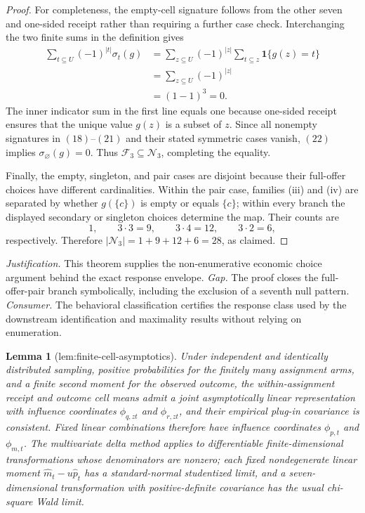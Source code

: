 \documentclass{article}
\newtheorem{lemma}{Lemma}
\begin{document}
\begin{proof}
For completeness, the empty-cell signature follows from the other
seven and one-sided receipt rather than requiring a further case
check.  Interchanging the two finite sums in the definition gives
\[
\begin{aligned}
\sum_{t\subseteq U}(-1)^{|t|}\sigma_t(g)
&=\sum_{z\subseteq U}(-1)^{|z|}
  \sum_{t\subseteq z}\mathbf 1\{g(z)=t\}\\
&=\sum_{z\subseteq U}(-1)^{|z|}\\
&=(1-1)^3=0.
\end{aligned} \tag{22}
\]
The inner indicator sum in the first line equals one because
one-sided receipt ensures that the unique value \(g(z)\) is a subset
of \(z\).  Since all nonempty signatures in
\((18)\)--\((21)\) and their stated symmetric cases vanish,
\((22)\) implies \(\sigma_\varnothing(g)=0\).  Thus
\(\mathcal F_3\subseteq\mathcal N_3\), completing the equality.

Finally, the empty, singleton, and pair cases are disjoint because
their full-offer choices have different cardinalities.  Within the
pair case, families (iii) and (iv) are separated by whether
\(g(\{c\})\) is empty or equals \(\{c\}\); within every branch the
displayed secondary or singleton choices determine the map.  Their counts are
\[
1,
\qquad
3\cdot3=9,
\qquad
3\cdot4=12,
\qquad
3\cdot2=6,
\]
respectively.  Therefore
\(|\mathcal N_3|=1+9+12+6=28\), as claimed.
\end{proof}
\par\smallskip\noindent \textit{Justification.} This theorem supplies the non-enumerative economic choice argument behind the exact response envelope. \textit{Gap.} The proof closes the full-offer-pair branch symbolically, including the exclusion of a seventh null pattern. \textit{Consumer.} The behavioral classification certifies the response class used by the downstream identification and maximality results without relying on enumeration.

\begin{lemma}[lem:finite-cell-asymptotics]\label{lem:finite-cell-asymptotics}
Under independent and identically distributed sampling, positive probabilities for the finitely many assignment arms, and a finite second moment for the observed outcome, the within-assignment receipt and outcome cell means admit a joint asymptotically linear representation with influence coordinates \(\phi_{q,zt}\) and \(\phi_{r,zt}\), and their empirical plug-in covariance is consistent.  Fixed linear combinations therefore have influence coordinates \(\phi_{p,t}\) and \(\phi_{m,t}\).  The multivariate delta method applies to differentiable finite-dimensional transformations whose denominators are nonzero; each fixed nondegenerate linear moment \(\widehat m_t-u\widehat p_t\) has a standard-normal studentized limit, and a seven-dimensional transformation with positive-definite covariance has the usual chi-square Wald limit.
\end{lemma}
\end{document}
